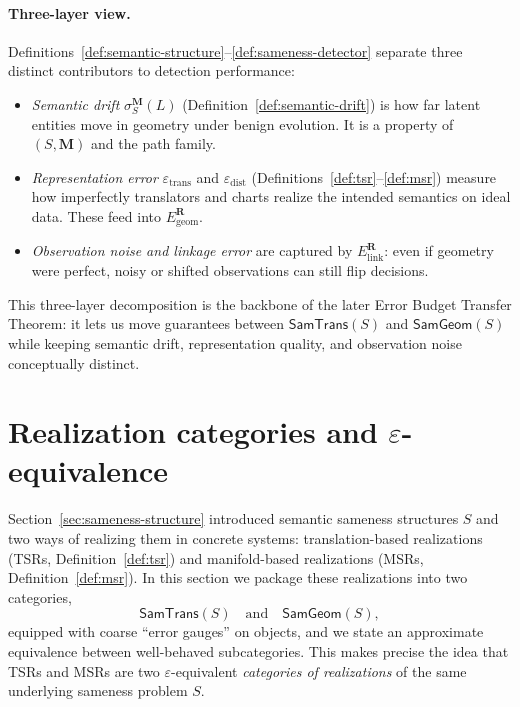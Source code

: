 \documentclass[11pt]{article}
\newcommand{\SamTrans}{\mathsf{SamTrans}}
\newcommand{\SamGeom}{\mathsf{SamGeom}}
\begin{document}
\paragraph{Three-layer view.}
Definitions~\ref{def:semantic-structure}--\ref{def:sameness-detector} separate three distinct
contributors to detection performance:
\begin{itemize}[leftmargin=*]
\item \emph{Semantic drift} $\sigma_S^{\mathbf{M}}(L)$ (Definition~\ref{def:semantic-drift})
is how far latent entities move in geometry under benign evolution. It is a property of
$(S,\mathbf{M})$ and the path family.

\item \emph{Representation error} $\varepsilon_{\mathrm{trans}}$ and $\varepsilon_{\mathrm{dist}}$
(Definitions~\ref{def:tsr}--\ref{def:msr}) measure how imperfectly translators and charts
realize the intended semantics on ideal data. These feed into $E_{\mathrm{geom}}^{\mathbf{R}}$.

\item \emph{Observation noise and linkage error} are captured by $E_{\mathrm{link}}^{\mathbf{R}}$:
even if geometry were perfect, noisy or shifted observations can still flip decisions.
\end{itemize}
This three-layer decomposition is the backbone of the later Error Budget Transfer Theorem:
it lets us move guarantees between $\SamTrans(S)$ and $\SamGeom(S)$ while keeping semantic
drift, representation quality, and observation noise conceptually distinct.

\section{Realization categories and $\varepsilon$-equivalence}
\label{sec:realization-categories}

Section~\ref{sec:sameness-structure} introduced semantic sameness structures $S$ and two ways of realizing
them in concrete systems: translation-based realizations (TSRs, Definition~\ref{def:tsr}) and
manifold-based realizations (MSRs, Definition~\ref{def:msr}). In this section we package these
realizations into two categories,
\[
\SamTrans(S)
\quad\text{and}\quad
\SamGeom(S),
\]
equipped with coarse ``error gauges'' on objects, and we state an approximate equivalence between
well-behaved subcategories. This makes precise the idea that TSRs and MSRs are two
$\varepsilon$-equivalent \emph{categories of realizations} of the same underlying sameness problem $S$.
\end{document}
